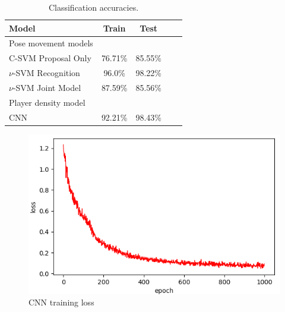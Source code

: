 \documentclass{article}
\begin{document}
\begin{table}[t]
\label{sample-table}
\vskip 0.15in
\begin{center}
\begin{small}
\begin{sc}
\begin{tabular}{lcccr}
\toprule
Model & Train & Test \\
\midrule
Pose movement models \\
\midrule
C-SVM Proposal Only   & 76.71\% & 85.55\% \\
$\nu$-SVM Recognition & 96.0\% & 98.22\% \\
$\nu$-SVM Joint Model    & 87.59\% & 85.56\% \\
\midrule
Player density model \\
\midrule
CNN     & 92.21\% & 98.43\% \\
\bottomrule
\end{tabular}
\end{sc}
\end{small}
\end{center}
\caption{Classification accuracies.}
\vskip -0.1in
\end{table}

\begin{figure}[ht]
\vskip 0.15in
\begin{center}
\centerline{\includegraphics[width=\columnwidth]{cnn_train_loss_font.png}}
\caption{CNN training loss}
\label{fig:cnn_train_loss}
\end{center}
\vskip -0.2in
\end{figure}
\end{document}
